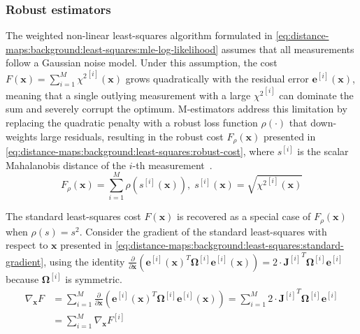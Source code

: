 \subsubsection{Robust estimators}
\label{sec:distance-maps:background:least-squares:robust-estimators}

The weighted non-linear least-squares algorithm formulated in
\eqref{eq:distance-maps:background:least-squares:mle-log-likelihood}
assumes that all measurements follow a Gaussian noise model.
Under this assumption, the cost
$F(\mathbf{x}) = \sum_{i=1}^{M} {\chi^2}^{[i]}(\mathbf{x})$
grows quadratically with the residual error $\mathbf{e}^{[i]}(\mathbf{x})$,
meaning that a single outlying measurement with a large ${\chi^2}^{[i]}$ can
dominate the sum and severely corrupt the optimum.
M-estimators address this limitation by replacing the quadratic penalty with
a robust loss function $\rho(\cdot)$ that down-weights large residuals,
resulting in the robust cost $F_{\rho}(\mathbf{x})$ presented in
\eqref{eq:distance-maps:background:least-squares:robust-cost},
where $s^{[i]}$ is the scalar Mahalanobis distance of the $i$-th
measurement~\cite{huber:book:1981}.
\begin{equation}
\label{eq:distance-maps:background:least-squares:robust-cost}
F_{\rho}(\mathbf{x}) =
\sum_{i=1}^{M} \rho\!\left(s^{[i]}(\mathbf{x})\right),
\;
s^{[i]}(\mathbf{x}) = \sqrt{{\chi^2}^{[i]}(\mathbf{x})}
\end{equation}

The standard least-squares cost $F(\mathbf{x})$ is recovered as
a special case of $F_{\rho}(\mathbf{x})$ when $\rho(s) = s^2$.
Consider the gradient of the standard least-squares with respect to $\mathbf{x}$
presented in
\eqref{eq:distance-maps:background:least-squares:standard-gradient},
using the identity
$\frac{\partial}{\partial \mathbf{x}}\!\left(\mathbf{e}^{[i]}(\mathbf{x})^T \mathbf{\Omega}^{[i]} \mathbf{e}^{[i]}(\mathbf{x})\right) = 2 \cdot {\mathbf{J}^{[i]}}^T \mathbf{\Omega}^{[i]} \mathbf{e}^{[i]}$
because $\mathbf{\Omega}^{[i]}$ is symmetric.
\begin{equation}
\label{eq:distance-maps:background:least-squares:standard-gradient}
\begin{aligned}
\nabla_{\mathbf{x}} F
& = \sum_{i=1}^{M}
    \frac{\partial}{\partial \mathbf{x}}
    \!\left(\mathbf{e}^{[i]}(\mathbf{x})^T \mathbf{\Omega}^{[i]} \mathbf{e}^{[i]}(\mathbf{x})\right)
  = \sum_{i=1}^{M} 2 \cdot {\mathbf{J}^{[i]}}^T \mathbf{\Omega}^{[i]} \mathbf{e}^{[i]}\\
& = \sum_{i=1}^{M} \nabla_{\mathbf{x}} F^{[i]}
\end{aligned}
\end{equation}

